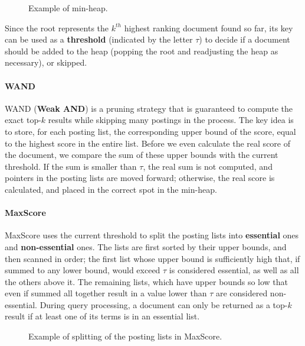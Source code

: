 \begin{figure}[!ht]
    \centering
    
    \caption{Example of min-heap.}
    \label{fig:min-heap}
\end{figure}

Since the root represents the $k^{th}$ highest ranking document found so far, its key can be used as a \textbf{threshold} (indicated by the letter $\tau$) to decide if a document should be added to the heap (popping the root and readjusting the heap as necessary), or skipped.

\paragraph{WAND}

WAND (\textbf{Weak AND}) is a pruning strategy that is guaranteed to compute the exact top-$k$ results while skipping many postings in the process. The key idea is to store, for each posting list, the corresponding upper bound of the score, equal to the highest score in the entire list. Before we even calculate the real score of the document, we compare the sum of these upper bounds with the current threshold. If the sum is smaller than $\tau$, the real sum is not computed, and pointers in the posting lists are moved forward; otherwise, the real score is calculated, and placed in the correct spot in the min-heap.

\paragraph{MaxScore}

MaxScore uses the current threshold to split the posting lists into \textbf{essential} ones and \textbf{non-essential} ones. The lists are first sorted by their upper bounds, and then scanned in order; the first list whose upper bound is sufficiently high that, if summed to any lower bound, would exceed $\tau$ is considered essential, as well as all the others above it. The remaining lists, which have upper bounds so low that even if summed all together result in a value lower than $\tau$ are considered non-essential. During query processing, a document can only be returned as a top-$k$ result if at least one of its terms is in an essential list.

\begin{figure}[!ht]
    \centering
    
    \caption{Example of splitting of the posting lists in MaxScore.}
    \label{fig:maxscore}
\end{figure}
